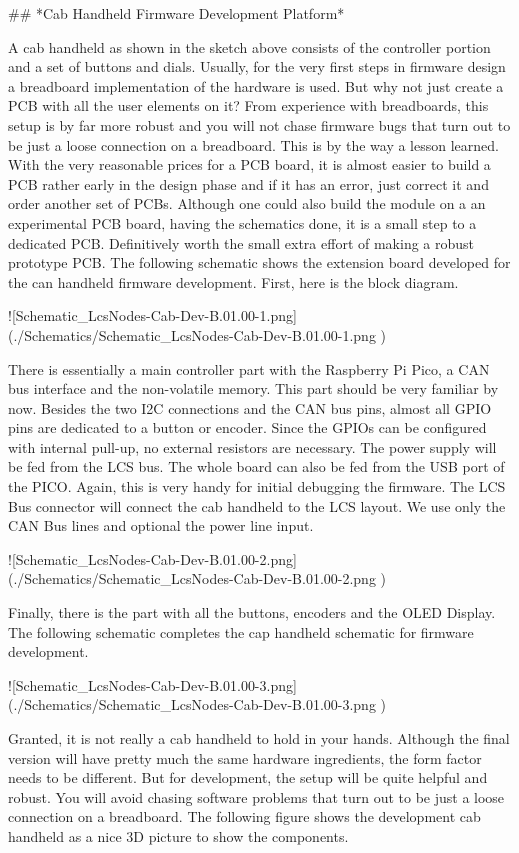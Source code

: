## *Cab Handheld Firmware Development Platform*

A cab handheld as shown in the sketch above consists of the controller portion and a set of buttons and dials. Usually, for the very first steps in firmware design a breadboard implementation of the hardware is used. But why not just create a PCB with all the user elements on it? From experience with breadboards, this setup is by far more robust and you will not chase firmware bugs that turn out to be just a loose connection on a breadboard. This is by the way a lesson learned. With the very reasonable prices for a PCB board, it is almost easier to build a PCB rather early in the design phase and if it has an error, just correct it and order another set of PCBs. Although one could also build the module on a an experimental PCB board, having the schematics done, it is a small step to a dedicated PCB. Definitively worth the small extra effort of making a robust prototype PCB. The following schematic shows the extension board developed for the can handheld firmware development. First, here is the block diagram.

![Schematic_LcsNodes-Cab-Dev-B.01.00-1.png](./Schematics/Schematic_LcsNodes-Cab-Dev-B.01.00-1.png )

There is essentially a main controller part with the Raspberry Pi Pico, a CAN bus interface and the non-volatile memory. This part should be very familiar by now. Besides the two I2C connections and the CAN bus pins, almost all GPIO pins are dedicated to a button or encoder. Since the GPIOs can be configured with internal pull-up, no external resistors are necessary. The power supply will be fed from the LCS bus. The whole board can also be fed from the USB port of the PICO. Again, this is very handy for initial debugging the firmware. The LCS Bus connector will connect the cab handheld to the LCS layout. We use only the CAN Bus lines and optional the power line input.

![Schematic_LcsNodes-Cab-Dev-B.01.00-2.png](./Schematics/Schematic_LcsNodes-Cab-Dev-B.01.00-2.png )

Finally, there is the part with all the buttons, encoders and the OLED Display. The following schematic completes the cap handheld schematic for firmware development.

![Schematic_LcsNodes-Cab-Dev-B.01.00-3.png](./Schematics/Schematic_LcsNodes-Cab-Dev-B.01.00-3.png )

Granted, it is not really a cab handheld to hold in your hands. Although the final version will have pretty much the same hardware ingredients, the form factor needs to be different. But for development, the setup will be quite helpful and robust. You will avoid chasing software problems that turn out to be just a loose connection on a breadboard. The following figure shows the development cab handheld as a nice 3D picture to show the components.

